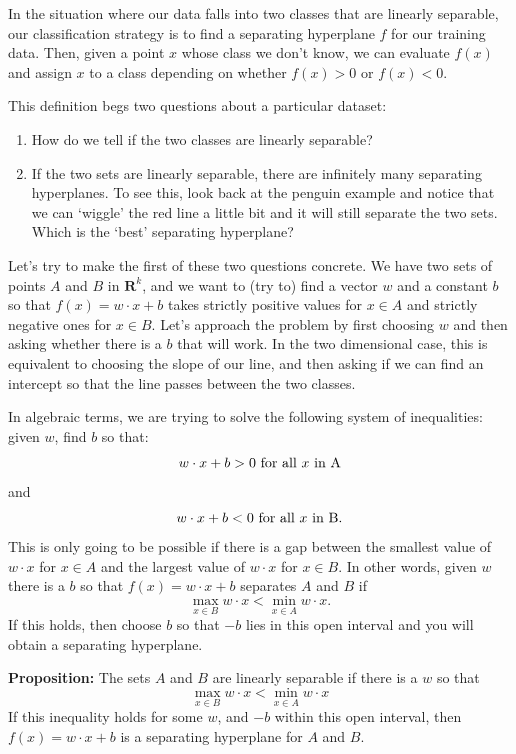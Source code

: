 \documentclass[
]{article}
\providecommand{\tightlist}{%
  \setlength{\itemsep}{0pt}\setlength{\parskip}{0pt}}
\begin{document}
In the situation where our data falls into two classes that are linearly
separable, our classification strategy is to find a separating
hyperplane \(f\) for our training data. Then, given a point \(x\) whose
class we don't know, we can evaluate \(f(x)\) and assign \(x\) to a
class depending on whether \(f(x)>0\) or \(f(x)<0\).

This definition begs two questions about a particular dataset:

\begin{enumerate}
\def\labelenumi{\arabic{enumi}.}
\tightlist
\item
  How do we tell if the two classes are linearly separable?
\item
  If the two sets are linearly separable, there are infinitely many
  separating hyperplanes. To see this, look back at the penguin example
  and notice that we can `wiggle' the red line a little bit and it will
  still separate the two sets. Which is the `best' separating
  hyperplane?
\end{enumerate}

Let's try to make the first of these two questions concrete. We have two
sets of points \(A\) and \(B\) in \(\mathbf{R}^{k}\), and we want to
(try to) find a vector \(w\) and a constant \(b\) so that
\(f(x)=w\cdot x+b\) takes strictly positive values for \(x\in A\) and
strictly negative ones for \(x\in B\). Let's approach the problem by
first choosing \(w\) and then asking whether there is a \(b\) that will
work. In the two dimensional case, this is equivalent to choosing the
slope of our line, and then asking if we can find an intercept so that
the line passes between the two classes.

In algebraic terms, we are trying to solve the following system of
inequalities: given \(w\), find \(b\) so that: \[
w\cdot x+b>0 \hbox{ for all $x$ in A}
\] and \[
w\cdot x+b<0\hbox{ for all $x$ in B}.
\] This is only going to be possible if there is a gap between the
smallest value of \(w\cdot x\) for \(x\in A\) and the largest value of
\(w\cdot x\) for \(x\in B\). In other words, given \(w\) there is a
\(b\) so that \(f(x)=w\cdot x+b\) separates \(A\) and \(B\) if \[
\max_{x\in B}w\cdot x < \min_{x\in A} w\cdot x.
\] If this holds, then choose \(b\) so that \(-b\) lies in this open
interval and you will obtain a separating hyperplane.

\textbf{Proposition:} The sets \(A\) and \(B\) are linearly separable if
there is a \(w\) so that \[
\max_{x\in B}w\cdot x < \min_{x\in A} w\cdot x
\] If this inequality holds for some \(w\), and \(-b\) within this open
interval, then \(f(x)=w\cdot x+b\) is a separating hyperplane for \(A\)
and \(B\).
\end{document}

